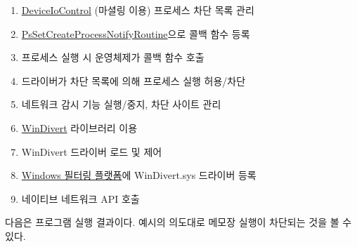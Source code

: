 \documentclass{tudelftposter}
\begin{document}
\begin{enumerate}
  \item \href{https://docs.microsoft.com/en-us/windows/win32/api/ioapiset/nf-ioapiset-deviceiocontrol}{DeviceIoControl} (마셜링 이용) 프로세스 차단 목록 관리
  \item \href{https://docs.microsoft.com/en-us/windows-hardware/drivers/ddi/ntddk/nf-ntddk-pssetcreateprocessnotifyroutine}{PsSetCreateProcessNotifyRoutine}으로 콜백 함수 등록
  \item 프로세스 실행 시 운영체제가 콜백 함수 호출
  \item 드라이버가 차단 목록에 의해 프로세스 실행 허용/차단
  \item 네트워크 감시 기능 실행/중지, 차단 사이트 관리
  \item \href{https://reqrypt.org/windivert.html}{WinDivert} 라이브러리 이용
  \item WinDivert 드라이버 로드 및 제어
  \item \href{https://docs.microsoft.com/ko-kr/windows/win32/fwp/windows-filtering-platform-start-page}{Windows 필터링 플랫폼}에 WinDivert.sys 드라이버 등록
  \item 네이티브 네트워크 API 호출
\end{enumerate}

다음은 프로그램 실행 결과이다. 예시의 의도대로 메모장 실행이 차단되는 것을 볼 수 있다.

\end{document}
